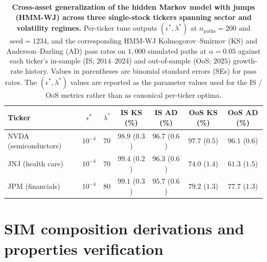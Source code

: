 \begin{table}[H]
\centering
\caption{\textbf{Cross-asset generalization of the hidden Markov model
    with jumps (HMM-WJ) across three
    single-stock tickers spanning sector and volatility regimes.}
    Per-ticker tune outputs $(\epsilon^{*}, \lambda^{*})$ at
    $n_{\mathrm{paths}} = 200$ and $\mathrm{seed} = 1234$, and the
    corresponding HMM-WJ Kolmogorov--Smirnov (KS) and Anderson--Darling
    (AD) pass rates on $1{,}000$ simulated paths at $\alpha = 0.05$
    against each ticker's in-sample (IS; $2014$--$2024$) and out-of-sample
    (OoS; $2025$) growth-rate history. Values in parentheses are binomial
    standard errors (SEs) for pass rates. The
    $(\epsilon^{*}, \lambda^{*})$ values are reported as the parameter
    values used for the IS / OoS metrics rather than as canonical
    per-ticker optima.}
\label{tab:cross_asset}
\small
\begin{tabular}{@{}lcccccc@{}}
\toprule
\textbf{Ticker} & \textbf{$\epsilon^{*}$} & \textbf{$\lambda^{*}$}
  & \textbf{IS KS (\%)} & \textbf{IS AD (\%)}
  & \textbf{OoS KS (\%)} & \textbf{OoS AD (\%)} \\ \midrule
NVDA (semiconductors)    & $10^{-4}$ & $70$ & $98.9$ ($0.3$) & $96.7$ ($0.6$) & $97.7$ ($0.5$) & $96.1$ ($0.6$) \\
JNJ (health care)        & $10^{-4}$ & $70$ & $99.4$ ($0.2$) & $96.3$ ($0.6$) & $74.0$ ($1.4$) & $61.3$ ($1.5$) \\
JPM (financials)         & $10^{-4}$ & $80$ & $99.1$ ($0.3$) & $95.7$ ($0.6$) & $79.2$ ($1.3$) & $77.7$ ($1.3$) \\
\bottomrule
\end{tabular}
\end{table}

\section{SIM composition derivations and properties verification}
\label{sec:supp-sim-derivations}

